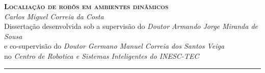 \documentclass[9pt,a4paper]{extarticle}
\begin{document}
\begin{center}
  \huge{\textbf{\textsc{Localiação de robôs em ambientes dinâmicos}}}\\[4mm]
  \Large{\emph{Carlos Miguel Correia da Costa}}\\[2mm]
  \normalsize{Dissertação desenvolvida sob a supervisão do \emph{Doutor Armando Jorge Miranda de Sousa}\\e co-supervisão do \emph{Doutor Germano Manuel Correia dos Santos Veiga}}\\
  \normalsize{no \emph{Centro de Robotica e Sistemas Inteligentes do INESC-TEC}}
\end{center}

\thispagestyle{empty}
\vspace*{-4mm}\noindent\rule{\textwidth}{0.4pt}\vspace*{4mm}



\end{document}
